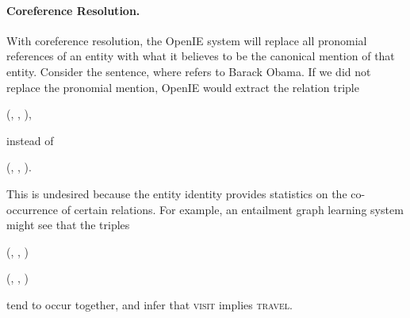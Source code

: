 \paragraph{Coreference Resolution.}
With coreference resolution, the OpenIE system will replace all
pronomial references of an entity with what it believes to be the canonical
mention of that entity. Consider the sentence, 
where  refers to Barack Obama. If we did not replace the pronomial
mention, OpenIE would extract the relation triple
\begin{center}
(, , ),
\end{center}
instead of 
\begin{center}
(, , ).
\end{center}
This is undesired because the entity identity provides statistics on 
the co-occurrence of certain relations. For example, an entailment
graph learning system might see that the triples
\begin{description}
  \item (, , )
  \item (, , )
\end{description}
tend to occur together, and infer that \textsc{visit} implies \textsc{travel}.

